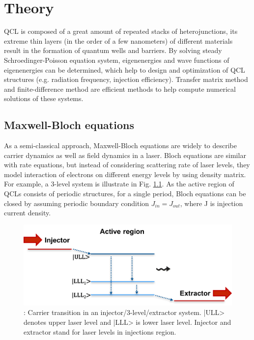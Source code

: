 \documentclass[11pt,final]{scrbook}
\begin{document}
\chapter{Theory}
QCL is composed of a great amount of repeated stacks of heterojunctions, its extreme thin layers (in the order of a few nanometers) of different materials result in the formation of quantum wells and barriers. By solving steady Schroedinger-Poisson equation system, eigenenergies and wave functions of eigenenergies can be determined, which help to design and optimization of QCL structures (e.g. radiation frequency, injection efficiency). Transfer matrix method \cite{jonsson1990solving} and finite-difference method \cite{tan1990self} are efficient methods to help compute numerical solutions of these systems. 
\section{Maxwell-Bloch equations}
As a semi-classical approach, Maxwell-Bloch equations are widely to describe carrier dynamics as well as field dynamics in a laser. Bloch equations are similar with rate equations, but instead of considering scattering rate of laser levels, they model interaction of electrons on different energy levels by using density matrix. For example, a 3-level system is illustrate in Fig. \ref{fig:MB_levelsystem}. As the active region of QCLs consists of periodic structures, for a single period, Bloch equations can be closed by assuming periodic boundary condition $J_{in}=J_{out}$, where J is injection current density.
\begin{figure}[htbp]
\begin{center}
\includegraphics[scale=0.8]{images/MB_levelsystem}
\caption{: Carrier transition in an injector/3-level/extractor system. |ULL> denotes upper laser level and |LLL> is lower laser level. Injector and extractor stand for laser levels in injections region.}
\label{fig:MB_levelsystem}
\end{center}
\end{figure}
\end{document}
